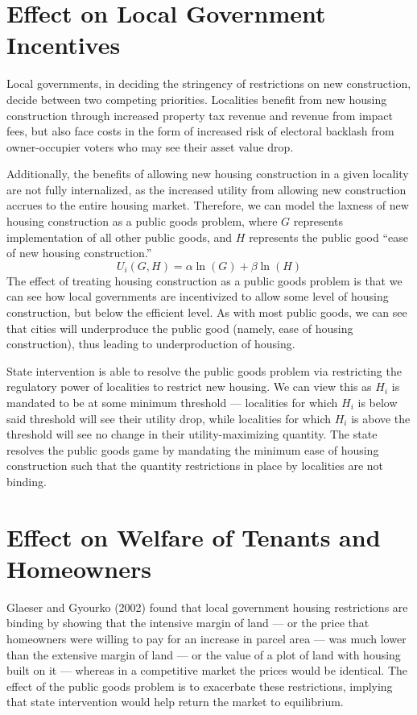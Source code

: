 \documentclass[12pt]{extarticle}
\newlength\tindent
\renewcommand{\indent}{\hspace*{\tindent}}
\begin{document}
  \section*{Effect on Local Government Incentives}%
  \indent Local governments, in deciding the stringency of restrictions on new construction, decide between two competing priorities. Localities benefit from new housing construction through increased property tax revenue and revenue from impact fees,\supercite{impact_fees} but also face costs in the form of increased risk of electoral backlash from owner-occupier voters who may see their asset value drop.\supercite{owner_nimbys}

  \indent Additionally, the benefits of allowing new housing construction in a given locality are not fully internalized, as the increased utility from allowing new construction accrues to the entire housing market. Therefore, we can model the laxness of new housing construction as a public goods problem, where $G$ represents implementation of all other public goods, and $H$ represents the public good ``ease of new housing construction.''
  \[U_i(G,H) = \alpha \ln(G) + \beta \ln(H)\]
  \indent The effect of treating housing construction as a public goods problem is that we can see how local governments are incentivized to allow some level of housing construction, but below the efficient level. As with most public goods, we can see that cities will underproduce the public good (namely, ease of housing construction), thus leading to underproduction of housing.

  \indent State intervention is able to resolve the public goods problem via restricting the regulatory power of localities to restrict new housing. We can view this as $H_i$ is mandated to be at some minimum threshold --- localities for which $H_i$ is below said threshold will see their utility drop, while localities for which $H_i$ is above the threshold will see no change in their utility-maximizing quantity. The state resolves the public goods game by mandating the minimum ease of housing construction such that the quantity restrictions in place by localities are not binding.
  \section*{Effect on Welfare of Tenants and Homeowners}%
  \indent Glaeser and Gyourko (2002) found that local government housing restrictions are binding by showing that the intensive margin of land --- or the price that homeowners were willing to pay for an increase in parcel area --- was much lower than the extensive margin of land --- or the value of a plot of land with housing built on it --- whereas in a competitive market the prices would be identical.\supercite{glaeser_gyourko_2002} The effect of the public goods problem is to exacerbate these restrictions, implying that state intervention would help return the market to equilibrium.
\end{document}
